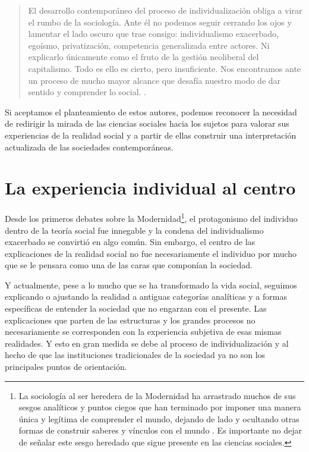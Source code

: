 \documentclass[
  spanish,
  11pt,
  a4paper,
]{scrbook}
\begin{document}
\begin{quote}
El desarrollo contemporáneo del proceso de individualización obliga a
virar el rumbo de la sociología. Ante él no podemos seguir cerrando los
ojos y lamentar el lado oscuro que trae consigo: individualismo
exacerbado, egoísmo, privatización, competencia generalizada entre
actores. Ni explicarlo únicamente como el fruto de la gestión neoliberal
del capitalismo. Todo es ello es cierto, pero insuficiente. Nos
encontramos ante un proceso de mucho mayor alcance que desafía nuestro
modo de dar sentido y comprender lo social.
\autocite[209]{Martuccelli2017}.
\end{quote}

Si aceptamos el planteamiento de estos autores, podemos reconocer la
necesidad de redirigir la mirada de las ciencias sociales hacia los
sujetos para valorar sus experiencias de la realidad social y a partir
de ellas construir una interpretación actualizada de las sociedades
contemporáneas.

\section*{La experiencia individual al
centro}\label{la-experiencia-individual-al-centro}


Desde los primeros debates sobre la Modernidad\footnote{La sociología al
  ser heredera de la Modernidad ha arrastrado muchos de sus sesgos
  analíticos y puntos ciegos que han terminado por imponer una manera
  única y legítima de comprender el mundo, dejando de lado y ocultando
  otras formas de construir saberes y vínculos con el mundo
  \autocite{Dubet2010}. Es importante no dejar de señalar este sesgo
  heredado que sigue presente en las ciencias sociales.}, el
protagonismo del individuo dentro de la teoría social fue innegable y la
condena del individualismo exacerbado se convirtió en algo común. Sin
embargo, el centro de las explicaciones de la realidad social no fue
necesariamente el individuo por mucho que se le pensara como una de las
caras que componían la sociedad.

Y actualmente, pese a lo mucho que se ha transformado la vida social,
seguimos explicando o ajustando la realidad a antiguas categorías
analíticas y a formas específicas de entender la sociedad que no
engarzan con el presente. Las explicaciones que parten de las
estructuras y los grandes procesos no necesariamente se corresponden con
la experiencia subjetiva de esas mismas realidades. Y esto en gran
medida se debe al proceso de individualización y al hecho de que las
instituciones tradicionales de la sociedad ya no son los principales
puntos de orientación.
\end{document}
